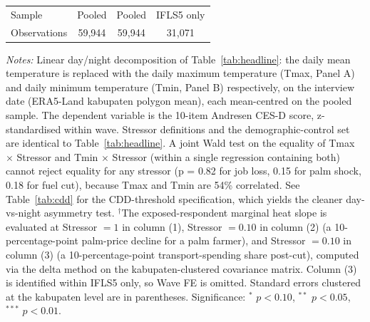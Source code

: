 \begin{table}[!htbp]
\begin{threeparttable}
\begin{tabular}{lccc}
Sample & Pooled & Pooled & IFLS5 only \\
Observations & 59,944 & 59,944 & 31,071 \\
\bottomrule
\end{tabular}
\begin{tablenotes}[flushleft]
\footnotesize
\item \textit{Notes:} Linear day/night decomposition of Table~\ref{tab:headline}: the daily mean temperature is replaced with the daily maximum temperature (Tmax, Panel A) and daily minimum temperature (Tmin, Panel B) respectively, on the interview date (ERA5-Land kabupaten polygon mean), each mean-centred on the pooled sample. The dependent variable is the 10-item Andresen CES-D score, z-standardised within wave. Stressor definitions and the demographic-control set are identical to Table~\ref{tab:headline}. A joint Wald test on the equality of Tmax $\times$ Stressor and Tmin $\times$ Stressor (within a single regression containing both) cannot reject equality for any stressor (p = 0.82 for job loss, 0.15 for palm shock, 0.18 for fuel cut), because Tmax and Tmin are 54\% correlated. See Table~\ref{tab:cdd} for the CDD-threshold specification, which yields the cleaner day-vs-night asymmetry test. $^{\dagger}$The exposed-respondent marginal heat slope is evaluated at Stressor $= 1$ in column (1), Stressor $= 0.10$ in column (2) (a 10-percentage-point palm-price decline for a palm farmer), and Stressor $= 0.10$ in column (3) (a 10-percentage-point transport-spending share post-cut), computed via the delta method on the kabupaten-clustered covariance matrix. Column (3) is identified within IFLS5 only, so Wave FE is omitted. Standard errors clustered at the kabupaten level are in parentheses. Significance: $^{*}$ $p<0.10$, $^{**}$ $p<0.05$, $^{***}$ $p<0.01$.
\end{tablenotes}
\end{threeparttable}
\end{table}
